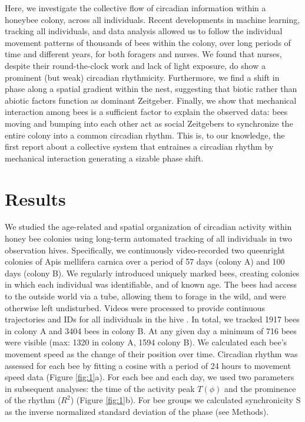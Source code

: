 \documentclass{article}
\begin{document}
Here, we investigate the collective flow of circadian information within a honeybee colony, across all individuals. Recent developments in machine learning, tracking all individuals, and data analysis allowed us to follow the individual movement patterns of thousands of bees within the colony, over long periods of time and different years, for both foragers and nurses. We found that nurses, despite their round-the-clock work and lack of light exposure, do show a prominent (but weak) circadian rhythmicity. Furthermore, we find a shift in phase along a spatial gradient within the nest, suggesting that biotic rather than abiotic factors function as dominant Zeitgeber. Finally, we show that mechanical interaction among bees is a sufficient factor to explain the observed data: bees moving and bumping into each other act as social Zeitgebers to synchronize the entire colony into a common circadian rhythm. This is, to our knowledge, the first report about a collective system that entraines a circadian rhythm by mechanical interaction generating a sizable phase shift. 


\section{Results}
We studied the age-related and spatial organization of circadian activity within honey bee colonies using long-term automated tracking of all individuals in two observation hives. Specifically, we continuously video-recorded two queenright colonies of Apis mellifera carnica over a period of 57 days (colony A) and 100 days (colony B). We regularly introduced uniquely marked bees, creating colonies in which each individual was identifiable, and of known age. The bees had access to the outside world via a tube, allowing them to forage in the wild, and were otherwise left undisturbed. Videos were processed to provide continuous trajectories and IDs for all individuals in the hive \cite{wario_automatic_2015, boenisch_tracking_2018, wild_automatic_2018, wild_social_2021}. In total, we tracked 1917 bees in colony A and 3404 bees in colony B. At any given day a minimum of 716 bees were visible (max: 1320 in colony A, 1594 colony B). We calculated each bee’s movement speed as the change of their position over time. Circadian rhythm was assessed for each bee by fitting a cosine with a period of 24 hours to movement speed data (Figure \ref{fig:1}a). For each bee and each day, we used two parameters in subsequent analyses: the time of the activity peak $T(\phi)$ and the prominence of the rhythm ($R^2$) (Figure \ref{fig:1}b). For bee groups we calculated synchronicity S as the inverse normalized standard deviation of the phase (see Methods).  
\end{document}
